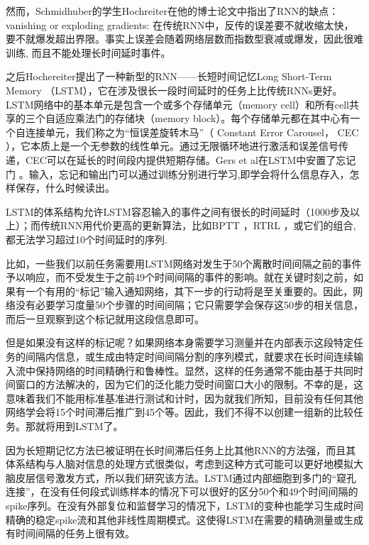 然而，Schmidhuber的学生Hochreiter在他的博士论文\cite{hochreiter1991untersuchungen}中指出了RNN的缺点：vanishing or exploding gradients:
在传统RNN中，反传的误差要不就收缩太快，要不就爆发超出界限。事实上误差会随着网络层数而指数型衰减或爆发，因此很难训练, 而且不能处理长时间延时事件。

之后Hochereiter提出了一种新型的RNN——长短时间记忆Long Short-Term Memory \cite{hochreiter1997long} （LSTM），它在涉及很长一段时间延时的任务上比传统RNNs更好。LSTM网络中的基本单元是包含一个或多个存储单元（memory cell）和所有cell共享的三个自适应乘法门的存储块（memory block）。每个存储单元都在其中心有一个自连接单元，我们称之为“恒误差旋转木马”（ Constant Error Carousel， CEC ），它本质上是一个无参数的线性单元。通过无限循环地进行激活和误差信号传递，CEC可以在延长的时间段内提供短期存储。Gers et al在LSTM中安置了忘记门 \cite{gers2000learning}。输入，忘记和输出门可以通过训练分别进行学习,即学会将什么信息存入，怎样保存，什么时候读出。

 

LSTM的体系结构允许LSTM容忍输入的事件之间有很长的时间延时（1000步及以上）；而传统RNN用代价更高的更新算法，比如BPTT \cite{williams1990efficient}，RTRL \cite{robinson1987utility,williams1989learning}，或它们的组合\cite{schmidhuber1992fixed,williams1995gradient},都无法学习超过10个时间延时的序列\cite{hochreiter1991untersuchungen,bengio1994learning,hochreiter1997long, gers2000learning,hochreiter2001gradient}.

比如，一些我们以前任务需要用LSTM网络对发生于50个离散时间间隔之前的事件予以响应，而不受发生于之前49个时间间隔的事件的影响。就在关键时刻之前，如果有一个有用的“标记”输入通知网络，其下一步的行动将是至关重要的。因此，网络没有必要学习度量50个步骤的时间间隔；它只需要学会保存这50步的相关信息，而后一旦观察到这个标记就用这段信息即可。

但是如果没有这样的标记呢？如果网络本身需要学习测量并在内部表示这段特定任务的间隔内信息，或生成由特定时间间隔分割的序列模式，就要求在长时间连续输入流中保持网络的时间精确行和鲁棒性。显然，这样的任务通常不能由基于共同时间窗口的方法解决的，因为它们的泛化能力受时间窗口大小的限制。不幸的是，这意味着我们不能用标准基准进行测试和计时，因为就我们所知，目前没有任何其他网络学会将15个时间滞后推广到45个等。因此，我们不得不以创建一组新的比较任务。那就将用到LSTM了。

因为长短期记忆方法已被证明在长时间滞后任务上比其他RNN的方法强，而且其体系结构与人脑对信息的处理方式很类似，考虑到这种方式可能可以更好地模拟大脑皮层信号激发方式，所以我们研究该方法。LSTM通过内部细胞到多门的“窥孔连接”，在没有任何段式训练样本的情况下可以很好的区分50个和49个时间间隔的spike序列。在没有外部复位和监督学习的情况下，LSTM的变种也能学习生成时间精确的稳定spike流和其他非线性周期模式。这使得LSTM在需要的精确测量或生成有时间间隔的任务上很有效。







